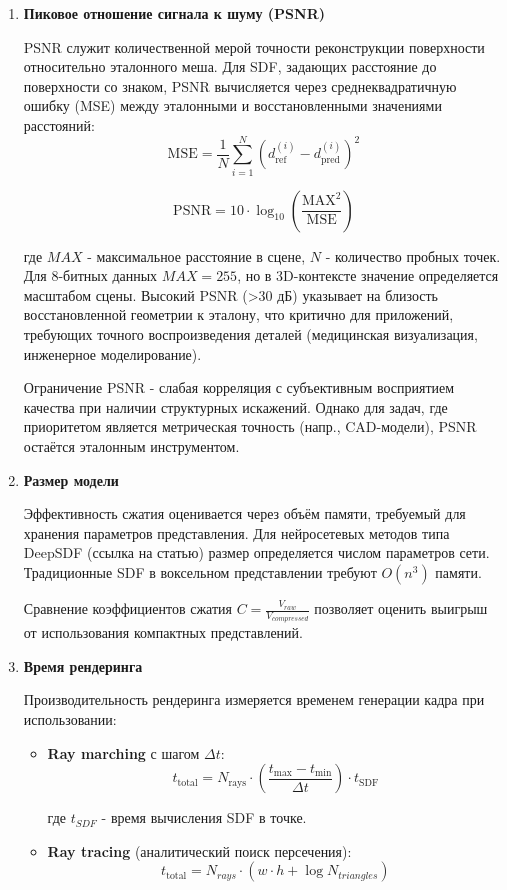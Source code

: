 \documentclass[a4paper,hidelinks,12pt]{article}
\begin{document}
\begin{enumerate}
	\item \textbf{Пиковое отношение сигнала к шуму (PSNR)}
	\par
	PSNR служит количественной мерой точности реконструкции поверхности относительно эталонного меша. Для SDF, 
	задающих расстояние до поверхности со знаком, PSNR вычисляется через среднеквадратичную ошибку (MSE) между 
	эталонными и восстановленными значениями расстояний:
	$$
	\text{MSE} = \frac{1}{N} \sum_{i=1}^{N} (d_{\text{ref}}^{(i)} - d_{\text{pred}}^{(i)})^2
	$$

	$$
	\text{PSNR} = 10 \cdot \log_{10}\left(\frac{\text{MAX}^2}{\text{MSE}}\right)
	$$

	где $ MAX $ - максимальное расстояние в сцене, $ N $ - количество пробных точек. Для 8-битных данных 
	$ MAX = 255 $, но в 3D-контексте значение определяется масштабом сцены. Высокий PSNR (>30 дБ) 
	указывает на близость восстановленной геометрии к эталону, что критично для приложений, требующих точного 
	воспроизведения деталей (медицинская визуализация, инженерное моделирование).
	
	Ограничение PSNR - слабая корреляция с субъективным восприятием качества при наличии структурных искажений. 
	Однако для задач, где приоритетом является метрическая точность (напр., CAD-модели), PSNR остаётся эталонным инструментом.

	\item \textbf{Размер модели}
	\par
	Эффективность сжатия оценивается через объём памяти, требуемый для хранения параметров представления. 
	Для нейросетевых методов типа DeepSDF (ссылка на статью) размер определяется числом параметров сети. Традиционные SDF в воксельном представлении требуют 
	$ O(n^3) $ памяти.

	Сравнение коэффициентов сжатия $ C = \frac{V_{raw}}{V_{compressed}} $ позволяет оценить выигрыш от использования компактных 
	представлений.

	\item \textbf{Время рендеринга}
	\par
	Производительность рендеринга измеряется временем генерации кадра при использовании:
	\begin{itemize}
		\item \textbf{Ray marching} с шагом $\Delta t$:
		$$
		t_{\text{total}} = N_{\text{rays}} \cdot \left(\frac{t_{\text{max}} - t_{\text{min}}}{\Delta t}\right) \cdot t_{\text{SDF}}
		$$

		где $ t_{SDF} $ - время вычисления SDF в точке.
		\item \textbf{Ray tracing} (аналитический поиск персечения):
		$$
		t_{\text{total}} = N_{rays} \cdot \left(w \cdot h + \log{N_{triangles}}\right) 
		$$


\end{itemize}
\end{enumerate}
\end{document}
